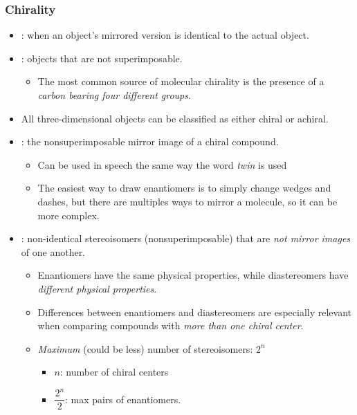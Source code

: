 \begin{itemize}
  \subsubsection{Chirality}\label{Chirality}
  \begin{itemize}
    \item {}: when an object's mirrored version is identical to the actual object.
    \item {}: objects that are not superimposable.
      \begin{itemize}
        \item The most common source of molecular chirality is the presence of a \emph{carbon bearing four different groups}.
      \end{itemize}
    \item All three-dimensional objects can be classified as either chiral or achiral.
    \item {}: the nonsuperimposable mirror image of a chiral compound.
      \begin{itemize}
          \item Can be used in speech the same way the word \emph{twin} is used
          \item The easiest way to draw enantiomers is to simply change wedges and dashes, but there are multiples ways to mirror a molecule, so it can be more complex.
      \end{itemize}
    \item {}: non-identical stereoisomers (nonsuperimposable) that are \emph{not mirror images} of one another. 
      \begin{itemize}
          \item  Enantiomers have the same physical properties, while diastereomers have \emph{different physical properties}.
          \item Differences between enantiomers and diastereomers are especially relevant when comparing compounds with \emph{more than one chiral center}.
          \item \emph{Maximum} (could be less) number of stereoisomers: \emph{\(2^n\)}
        \begin{itemize}
          \item \(n\): number of chiral centers
          \item \(\dfrac{2^n}{2}\): max pairs of enantiomers.
        \end{itemize}
      \end{itemize}
    \end{itemize}


\end{itemize}
